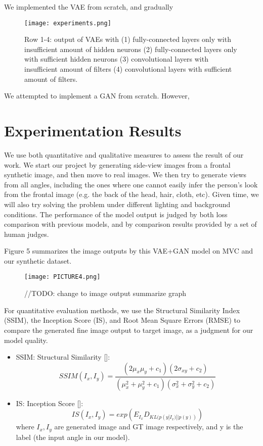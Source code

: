 \documentclass[10pt,conference]{IEEEtran}
\begin{document}
We implemented the VAE from scratch, and gradually 

\begin{figure}[htbp]
\centering
\texttt{[image: experiments.png]}
\caption{Row 1-4: output of VAEs with (1) fully-connected layers only with insufficient amount of  hidden neurons (2) fully-connected layers only with sufficient hidden neurons (3) convolutional layers with insufficient amount of filters (4) convolutional layers with sufficient amount of filters. }
\end{figure}

We attempted to implement a GAN from scratch. However, 

\section{Experimentation Results}

We use both quantitative and qualitative measures to assess the result of our work. 
We  start our project by generating side-view images from a frontal synthetic image, and then move to real images. We then try to generate views from all angles, including the ones where one cannot easily infer the person’s look from the frontal image (e.g. the back of the head, hair, cloth, etc). Given time, we will also try solving the problem under different lighting and background conditions. The performance of the model output is judged by both loss comparison with previous models, and by comparison results provided by a set of human judges.

Figure 5 summarizes the image outputs by this VAE+GAN model on MVC and our synthetic dataset.

\begin{figure*}[htbp]
\centering
\texttt{[image: PICTURE4.png]}
\caption{//TODO: change to image output summarize graph}
\end{figure*}

For quantitative evaluation methods, we use the Structural Similarity Index (SSIM), the Inception Score (IS), and Root Mean Square Errors (RMSE) to compare the generated fine image output to target image, as a judgment for our model quality.

\begin{itemize}
\item SSIM: Structural Similarity []:
$$SSIM(I_x,I_y)=\frac{(2\mu_x \mu_y + c_1)(2\sigma_{xy}+c_2)}{(\mu_x^2+\mu_y^2 +c_1)(\sigma_x^2+\sigma_y^2+c_2)}$$

\item IS: Inception Score []:
$$IS(I_x,I_y)=exp(E_{I_x}D_{KL(p(y|I_x)||p(y))})$$
where $I_x,I_y$ are generated image and GT image respectively, and y is the label (the input angle in our model).

\end{itemize}
\end{document}
